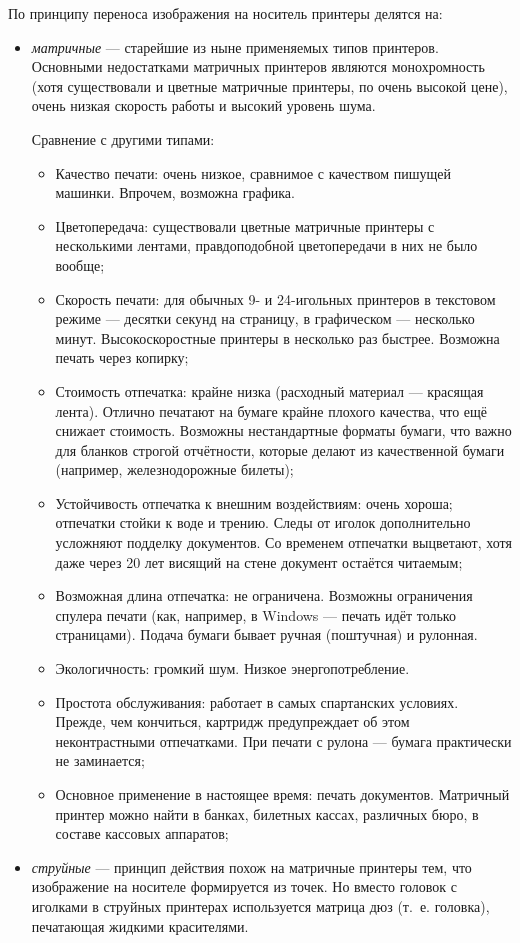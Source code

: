 По принципу переноса изображения на носитель принтеры делятся на:
\begin{itemize}
 \item \emph{матричные} --- старейшие из ныне применяемых типов принтеров. Основными недостатками матричных принтеров являются монохромность (хотя существовали и цветные матричные принтеры, по очень высокой цене), очень низкая скорость работы и высокий уровень шума.
 
 Сравнение с другими типами:
 \begin{itemize}
  \item Качество печати: очень низкое, сравнимое с качеством пишущей машинки. Впрочем, возможна графика.
  \item Цветопередача: существовали цветные матричные принтеры с несколькими лентами, правдоподобной цветопередачи в них не было вообще;
  \item Скорость печати: для обычных 9- и 24-игольных принтеров в текстовом режиме --- десятки секунд на страницу, в графическом --- несколько минут. Высокоскоростные принтеры в несколько раз быстрее. Возможна печать через копирку;
  \item Стоимость отпечатка: крайне низка (расходный материал --- красящая лента). Отлично печатают на бумаге крайне плохого качества, что ещё снижает стоимость. Возможны нестандартные форматы бумаги, что важно для бланков строгой отчётности, которые делают из качественной бумаги (например, железнодорожные билеты);
  \item Устойчивость отпечатка к внешним воздействиям: очень хороша; отпечатки стойки к воде и трению. Следы от иголок дополнительно усложняют подделку документов. Со временем отпечатки выцветают, хотя даже через 20 лет висящий на стене документ остаётся читаемым;
  \item Возможная длина отпечатка: не ограничена. Возможны ограничения спулера печати (как, например, в Windows --- печать идёт только страницами). Подача бумаги бывает ручная (поштучная) и рулонная.
  \item Экологичность: громкий шум. Низкое энергопотребление.
  \item Простота обслуживания: работает в самых спартанских условиях. Прежде, чем кончиться, картридж предупреждает об этом неконтрастными отпечатками. При печати с рулона --- бумага практически не заминается;
  \item Основное применение в настоящее время: печать документов. Матричный принтер можно найти в банках, билетных кассах, различных бюро, в составе кассовых аппаратов;
 \end{itemize}
 \item \emph{струйные} --- принцип действия похож на матричные принтеры тем, что изображение на носителе формируется из точек. Но вместо головок с иголками в струйных принтерах используется матрица дюз (т.~е. головка), печатающая жидкими красителями.
 

\end{itemize}
